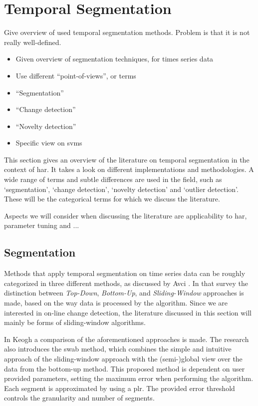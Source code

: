 \section{Temporal Segmentation}\label{sec:temporal_segmentation}

Give overview of used temporal segmentation methods. Problem is that it is not really well-defined.

\begin{itemize}
  \item Given overview of segmentation techniques, for times series data
  \item Use different ``point-of-views'', or terms
  \item ``Segmentation''
  \item ``Change detection''
  \item ``Novelty detection''
  \item Specific view on \glspl{svm}
\end{itemize}

This section gives an overview of the literature on temporal segmentation in the context of \gls{har}.
It takes a look on different implementations and methodologies.
A wide range of terms and subtle differences are used in the field, such as `segmentation', `change detection', `novelty detection' and `outlier detection'.
These will be the categorical terms for which we discuss the literature.

Aspects we will consider when discussing the literature are applicability to \gls{har}, parameter tuning and ... 

\subsection{Segmentation}\label{subsec:segmentation}

Methods that apply temporal segmentation on time series data can be roughly categorized in three different methods, as discussed by Avci \etal \cite{avci2010activity}.
In that survey the distinction between \emph{Top-Down}, \emph{Bottom-Up}, and \emph{Sliding-Window} approaches is made, based on the way data is processed by the algorithm.
Since we are interested in on-line change detection, the literature discussed in this section will mainly be forms of sliding-window algorithms.

In Keogh \etal \cite{keogh2001online} a comparison of the aforementioned approaches is made.
The research also introduces the \gls{swab} method, which combines the simple and intuitive approach of the sliding-window approach with the (semi-)global view over the data from the bottom-up method.
This proposed method is dependent on user provided parameters, setting the maximum error when performing the algorithm.
Each segment is approximated by using a \gls{plr}.
The provided error threshold controls the granularity and number of segments.

